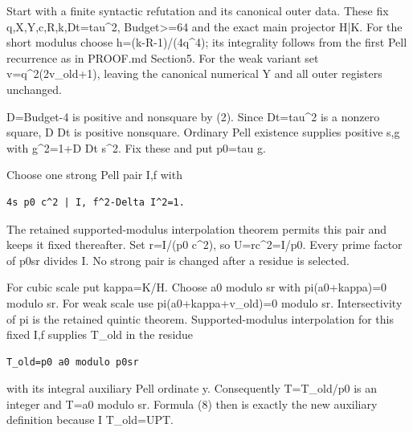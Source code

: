 Start with a finite syntactic refutation and its canonical outer data. These fix q,X,Y,c,R,k,Dt=\allowbreak{}tau\textasciicircum{}\allowbreak{}2, Budget\textgreater{}\allowbreak{}=\allowbreak{}64 and the exact main projector H|K. For the short modulus choose h=\allowbreak{}(k-R-1)/\allowbreak{}(4q\textasciicircum{}\allowbreak{}4); its integrality follows from the first Pell recurrence as in PROOF.md Section5. For the weak variant set v=\allowbreak{}q\textasciicircum{}\allowbreak{}2(2v\_\allowbreak{}old+\allowbreak{}1), leaving the canonical numerical Y and all outer registers unchanged.



D=\allowbreak{}Budget-4 is positive and nonsquare by (2). Since Dt=\allowbreak{}tau\textasciicircum{}\allowbreak{}2 is a nonzero square, D Dt is positive nonsquare. Ordinary Pell existence supplies positive s,g with g\textasciicircum{}\allowbreak{}2=\allowbreak{}1+\allowbreak{}D Dt s\textasciicircum{}\allowbreak{}2. Fix these and put p0=\allowbreak{}tau g.



Choose one strong Pell pair I,f with



\begin{verbatim}
4s p0 c^2 | I, f^2-Delta I^2=1.
\end{verbatim}

The retained supported-modulus interpolation theorem permits this pair and keeps it fixed thereafter. Set r=\allowbreak{}I/\allowbreak{}(p0 c\textasciicircum{}\allowbreak{}2), so U=\allowbreak{}rc\textasciicircum{}\allowbreak{}2=\allowbreak{}I/\allowbreak{}p0. Every prime factor of p0sr divides I. No strong pair is changed after a residue is selected.



For cubic scale put kappa=\allowbreak{}K/\allowbreak{}H. Choose a0 modulo sr with pi(a0+\allowbreak{}kappa)=\allowbreak{}0 modulo sr. For weak scale use pi(a0+\allowbreak{}kappa+\allowbreak{}v\_\allowbreak{}old)=\allowbreak{}0 modulo sr. Intersectivity of pi is the retained quintic theorem. Supported-modulus interpolation for this fixed I,f supplies T\_\allowbreak{}old in the residue



\begin{verbatim}
T_old=p0 a0 modulo p0sr
\end{verbatim}

with its integral auxiliary Pell ordinate y. Consequently T=\allowbreak{}T\_\allowbreak{}old/\allowbreak{}p0 is an integer and T=\allowbreak{}a0 modulo sr. Formula (8) then is exactly the new auxiliary definition because I T\_\allowbreak{}old=\allowbreak{}UPT.



